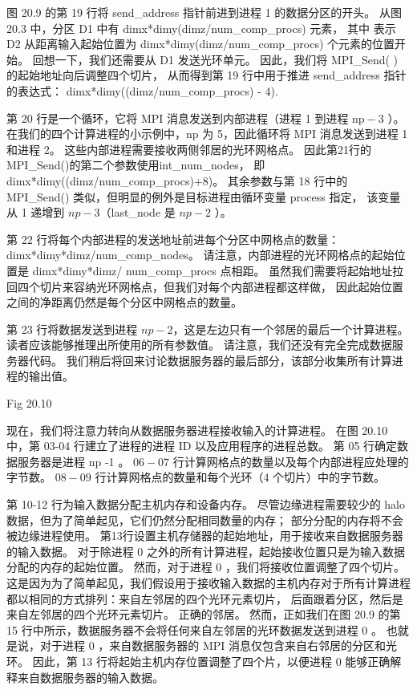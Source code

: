 图 20.9 的第 19 行将 send\_address 指针前进到进程 1 的数据分区的开头。
从图 20.3 中，分区 D1 中有 dimx*dimy(dimz/num\_comp\_procs) 元素，
其中 表示 D2 从距离输入起始位置为 dimx*dimy(dimz/num\_comp\_procs) 个元素的位置开始。 
回想一下，我们还需要从 D1 发送光环单元。 因此，我们将 MPI\_Send( ) 的起始地址向后调整四个切片，
从而得到第 19 行中用于推进 send\_address 指针的表达式： dimx*dimy((dimz/num\_comp\_procs) - 4).

第 20 行是一个循环，它将 MPI 消息发送到内部进程（进程 1 到进程 $\mathrm{np}-3$ ）。 
在我们的四个计算进程的小示例中，np 为 5，因此循环将 MPI 消息发送到进程 1 和进程 2。
这些内部进程需要接收两侧邻居的光环网格点。 因此第21行的MPI\_Send()的第二个参数使用int\_num\_nodes，
即dimx*dimy((dimz/num\_comp\_procs)+8)。 
其余参数与第 18 行中的 MPI\_Send() 类似，但明显的例外是目标进程由循环变量 process 指定，
该变量从 1 递增到 $n p-3$（last\_node 是 $n p-2$ ）。

第 22 行将每个内部进程的发送地址前进每个分区中网格点的数量：dimx*dimy*dimz/num\_comp\_nodes。 
请注意，内部进程的光环网格点的起始位置是 dimx*dimy*dimz/ num\_comp\_procs 点相距。 
虽然我们需要将起始地址拉回四个切片来容纳光环网格点，但我们对每个内部进程都这样做，
因此起始位置之间的净距离仍然是每个分区中网格点的数量。

第 23 行将数据发送到进程 $n p-2$，这是左边只有一个邻居的最后一个计算进程。 读者应该能够推理出所使用的所有参数值。 
请注意，我们还没有完全完成数据服务器代码。 我们稍后将回来讨论数据服务器的最后部分，该部分收集所有计算进程的输出值。

{\color{red} Fig 20.10}

现在，我们将注意力转向从数据服务器进程接收输入的计算进程。 
在图 20.10 中，第 03-04 行建立了进程的进程 ID 以及应用程序的进程总数。 第 05 行确定数据服务器是进程 np -1 。 
$06-07$ 行计算网格点的数量以及每个内部进程应处理的字节数。 $08-09$ 行计算网格点的数量和每个光环（4 个切片）中的字节数。

第 10-12 行为输入数据分配主机内存和设备内存。 
尽管边缘进程需要较少的 halo 数据，但为了简单起见，它们仍然分配相同数量的内存； 部分分配的内存将不会被边缘进程使用。 
第13行设置主机存储器的起始地址，用于接收来自数据服务器的输入数据。 
对于除进程 0 之外的所有计算进程，起始接收位置只是为输入数据分配的内存的起始位置。 
然而，对于进程 0 ，我们将接收位置调整了四个切片。 
这是因为为了简单起见，我们假设用于接收输入数据的主机内存对于所有计算进程都以相同的方式排列：来自左邻居的四个光环元素切片，
后面跟着分区，然后是来自左邻居的四个光环元素切片。 正确的邻居。 
然而，正如我们在图 20.9 的第 15 行中所示，数据服务器不会将任何来自左邻居的光环数据发送到进程 0 。 
也就是说，对于进程 0 ，来自数据服务器的 MPI 消息仅包含来自右邻居的分区和光环。 
因此，第 13 行将起始主机内存位置调整了四个片，以便进程 0 能够正确解释来自数据服务器的输入数据。

